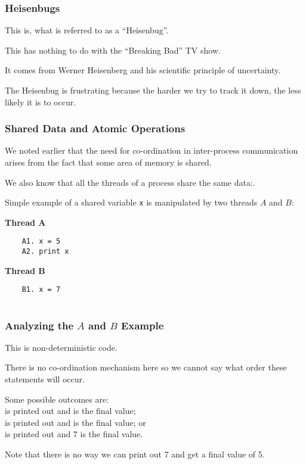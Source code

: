\begin{frame}
\frametitle{Heisenbugs}

This is, what is referred to as a ``Heisenbug''.

This has nothing to do with the ``Breaking Bad'' TV show. 

It comes from Werner Heisenberg and his scientific principle of uncertainty.

The Heisenbug is frustrating because the harder we try to track it down, the less likely it is to occur.


\end{frame}


\begin{frame}[fragile]
\frametitle{Shared Data and Atomic Operations}
We noted earlier that the need for co-ordination in inter-process communication arises from the fact that some area of memory is shared. 

We also know that all the threads of a process share the same data:. 

Simple example of a shared variable \texttt{x} is manipulated by two threads $A$ and $B$: 

\begin{multicols}{2}
\textbf{Thread A}
	\begin{verbatim}
	A1. x = 5
	A2. print x
	\end{verbatim}
\columnbreak
\textbf{Thread B}
	\begin{verbatim}
	B1. x = 7
	
	\end{verbatim}
\end{multicols}

\end{frame}

\begin{frame}
\frametitle{Analyzing the $A$ and $B$ Example}

This is non-deterministic code. 

There is no co-ordination mechanism here so we cannot say what order these statements will occur. 

Some possible outcomes are:\\
 is printed out and is the final value;\\
 is printed out and is the final value; or\\
 is printed out and 7 is the final value. 

Note that there is no way we can print out 7 and get a final value of 5.


\end{frame}

